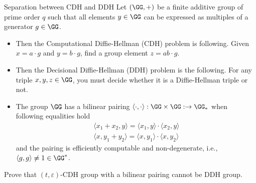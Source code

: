 \documentclass{crypto-exercise}
\author{Sven Laur}
\begin{document}
\begin{exercise}{Separation between CDH and DDH}
  Let $(\GG,+)$ be a finite additive group of prime order $q$ such that all elements $y\in\GG$ can be
  expressed as multiples of a generator $g\in\GG$.
  \begin{itemize}
  \item  Then the Computational
  Diffie-Hellman (CDH) problem is following. Given $x=a\cdot g$ and
  $y=b\cdot g$, find a group element $z=ab\cdot g$. 
  \item Then the Decisional
  Diffie-Hellman (DDH) problem is the following. For any triple
  $x,y,z\in\GG$, you must decide whether it is a Diffie-Hellman triple
  or not.
  \item The group $\GG$ has a bilinear pairing $\langle\cdot,\cdot \rangle: \GG\times\GG:\to\GG_*$ when following equalities hold
  \begin{align*}
     \langle x_1+x_2,y\rangle= \langle x_1,y\rangle\cdot \langle x_2,y\rangle\\
     \langle x,y_1+y_2\rangle= \langle x,y_1\rangle\cdot \langle x,y_2\rangle
  \end{align*}
  and the pairing is efficiently computable and non-degenerate, i.e., $\langle g,g \rangle\neq 1\in\GG^*$.
  \end{itemize}
  Prove that $(t,\varepsilon)$-CDH group with a bilinear pairing cannot be DDH group.  
  \end{exercise}
\begin{solution}

\end{solution}
\end{document}
